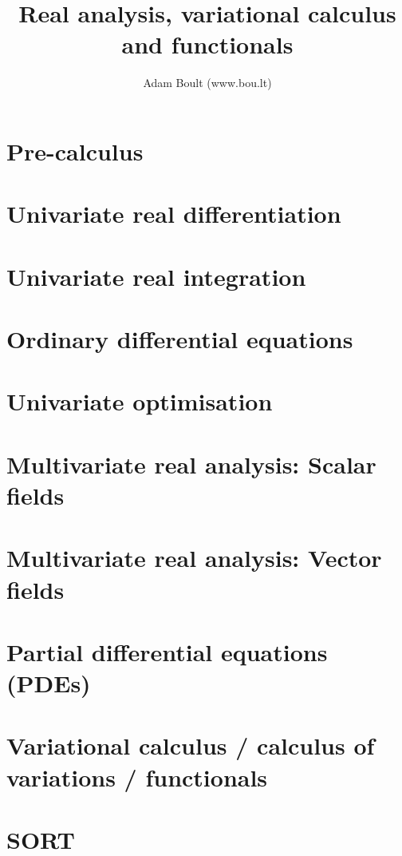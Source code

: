\documentclass[oneside]{book}
\begin{document}
\author{Adam Boult (www.bou.lt)}
\title{Real analysis, variational calculus and functionals}
\maketitle

\setcounter{tocdepth}{0}
\tableofcontents



\part{Pre-calculus}






\part{Univariate real differentiation}







\part{Univariate real integration}









\part{Ordinary differential equations}



\part{Univariate optimisation}


\part{Multivariate real analysis: Scalar fields}








\part{Multivariate real analysis: Vector fields}



\part{Partial differential equations (PDEs)}


\part{Variational calculus / calculus of variations / functionals}


\part{SORT}

\end{document}
